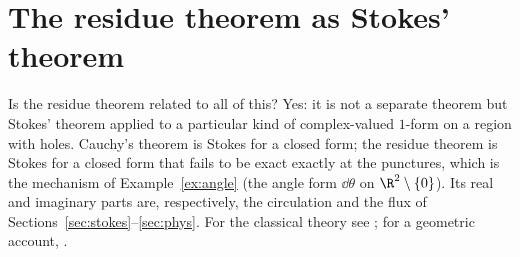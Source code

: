 \section{The residue theorem as Stokes' theorem}\label{sec:complex}

Is the residue theorem related to all of this? Yes: it is not a separate theorem but Stokes' theorem applied to a particular kind of complex-valued $1$-form on a region with holes.
Cauchy's theorem is Stokes for a closed form; the residue theorem is Stokes for a closed form that fails to be exact exactly at the punctures, which is the mechanism of Example~\ref{ex:angle}
(the angle form $\dd\theta$ on $\R^2\setminus\{0\}$). Its real and imaginary parts are, respectively, the circulation and the flux of Sections~\ref{sec:stokes}--\ref{sec:phys}. For the classical theory see \cite{Ahlfors}; for a geometric account, \cite{Needham}.








